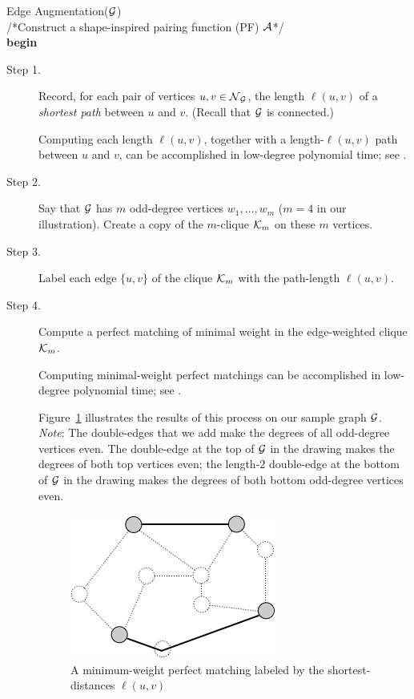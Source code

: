 \medskip

 {\sf Edge Augmentation}($\mbox{$\cal G$}$) \\
/*Construct a shape-inspired pairing function (PF) $\mbox{$\cal A$}$*/  \\
{\bf begin}
\begin{description}
\item[Step 1.]
%
Record, for each pair of vertices $u, v \in \mbox{$\cal N$}_{\mbox{{\scriptsize $\cal G$}}}$, the length $\ell(u,v)$ of a {\em shortest path} between $u$ and $v$.  (Recall that $\mbox{$\cal G$}$ is connected.)

\smallskip

Computing each length $\ell(u,v)$, together with a length-$\ell(u,v)$ path between $u$ and $v$, can be accomplished in low-degree polynomial time; see \cite{CLRS}.

\medskip\item[Step 2.]
%
Say that $\mbox{$\cal G$}$ has $m$ odd-degree vertices $w_1, \ldots, w_m$ ($m=4$ in our illustration).  Create a copy of the $m$-clique $\mbox{$\cal K$}_m$ on these $m$ vertices.

\medskip\item[Step 3.]
%
Label each edge $\{u,v\}$ of the clique $\mbox{$\cal K$}_m$ with the path-length $\ell(u,v)$.

\medskip\item[Step 4.]
%
Compute a perfect matching of minimal weight in the edge-weighted clique $\mbox{$\cal K$}_m$.

\smallskip

Computing minimal-weight perfect matchings can be accomplished in low-degree polynomial time; see \cite{CLRS}.

\smallskip

Figure~\ref{fig:Eulerianperfectmatching} illustrates the results of this process on our sample graph $\mbox{$\cal G$}$.   {\em Note}: The double-edges that we add make the degrees of all odd-degree vertices even.  The double-edge at the top of $\mbox{$\cal G$}$ in the drawing makes the degrees of both top vertices even; the length-$2$ double-edge at the bottom of $\mbox{$\cal G$}$ in the drawing makes the degrees of both bottom odd-degree vertices even.
\begin{figure}[hbt]
\begin{center}
       \includegraphics[scale=0.35]{FiguresGraph/EulerienPerfectMatching}
       \caption{A minimum-weight perfect matching labeled by the shortest-distances $\ell(u,v)$}
              \label{fig:Eulerianperfectmatching}
\end{center}
\end{figure}


\end{description}
